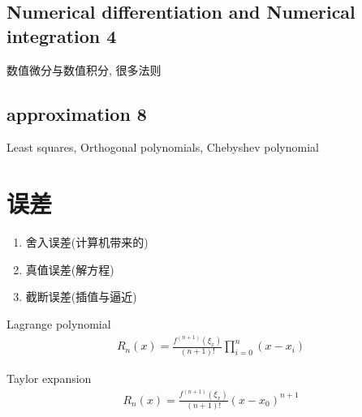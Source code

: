 \documentclass{source/Paper}
\begin{document}
    \subsection{Numerical differentiation and Numerical integration 4}
    数值微分与数值积分, 很多法则

    \subsection{approximation 8}
    Least squares, Orthogonal polynomials, Chebyshev polynomial
    

    
\section{误差}
\begin{enumerate}
    \item 舍入误差(计算机带来的)
    \item 真值误差(解方程)
    \item 截断误差(插值与逼近)
\end{enumerate}

Lagrange polynomial
\begin{align*}
    R_n(x)=\frac{f^{(n+1)}(\xi_x)}{(n+1)!}\prod_{i=0}^{n}(x-x_i)
\end{align*}

Taylor expansion
\begin{align*}
    R_n(x)=\frac{f^{(n+1)}(\xi_x)}{(n+1)!}(x-x_0)^{n+1}
\end{align*}
\end{document}
